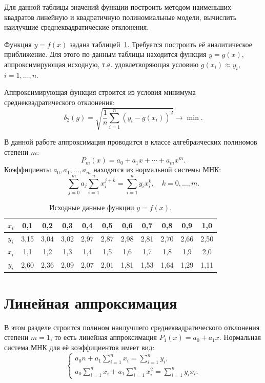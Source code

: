 \documentclass[a4paper, final]{article}
\begin{document}
Для данной таблицы значений функции построить методом наименьших квадратов
линейную и квадратичную полиномиальные модели, вычислить наилучшие
среднеквадратические отклонения.

Функция $y = f(x)$ задана таблицей~\ref{tab:source}. Требуется построить её
аналитическое приближение. Для этого по данным таблицы находится функция
$y = g(x)$, аппроксимирующая исходную, т.е. удовлетворяющая условию
$g(x_i) \approx y_i$, $i = 1, \ldots, n$.

Аппроксимирующая функция строится из условия минимума среднеквадратического
отклонения:
\[
\delta_2(g) = \sqrt{\frac{1}{n}\sum_{i=1}^{n}(y_i - g(x_i))^2} \to \min.
\]

В данной работе аппроксимация проводится в классе алгебраических полиномов
степени $m$:
\[
P_m(x) = a_0 + a_1 x + \cdots + a_m x^m.
\]
Коэффициенты $a_0, a_1, \ldots, a_m$ находятся из нормальной системы МНК:
\[
\sum_{j=0}^{m} a_j \sum_{i=1}^{n} x_i^{j+k} = \sum_{i=1}^{n} y_i x_i^k,
\quad k = 0, \ldots, m.
\]

\begin{table}[h!]
\centering
\begin{tabular}{|c|c|c|c|c|c|c|c|c|c|c|}
\hline
$x_i$ & 0,1 & 0,2 & 0,3 & 0,4 & 0,5 & 0,6 & 0,7 & 0,8 & 0,9 & 1,0 \\
\hline
$y_i$ & 3,15 & 3,04 & 3,02 & 2,97 & 2,87 & 2,98 & 2,81 & 2,70 & 2,66 & 2,50 \\
\hline
\hline
$x_i$ & 1,1 & 1,2 & 1,3 & 1,4 & 1,5 & 1,6 & 1,7 & 1,8 & 1,9 & 2,0 \\
\hline
$y_i$ & 2,60 & 2,36 & 2,09 & 2,07 & 2,01 & 1,81 & 1,53 & 1,64 & 1,29 & 1,11 \\
\hline
\end{tabular}
\caption{Исходные данные функции $y = f(x)$.}
\label{tab:source}
\end{table}

\newpage

\section{Линейная аппроксимация}

В этом разделе строится полином наилучшего среднеквадратического отклонения
степени $m = 1$, то есть линейная аппроксимация $P_1(x) = a_0 + a_1 x$.
Нормальная система МНК для её коэффициентов имеет вид:
\[
\begin{cases}
a_0 n + a_1 \displaystyle\sum_{i=1}^{n} x_i = \sum_{i=1}^{n} y_i, \\[6pt]
a_0 \displaystyle\sum_{i=1}^{n} x_i + a_1 \sum_{i=1}^{n} x_i^2 = \sum_{i=1}^{n} y_i x_i.
\end{cases}
\]
\end{document}
